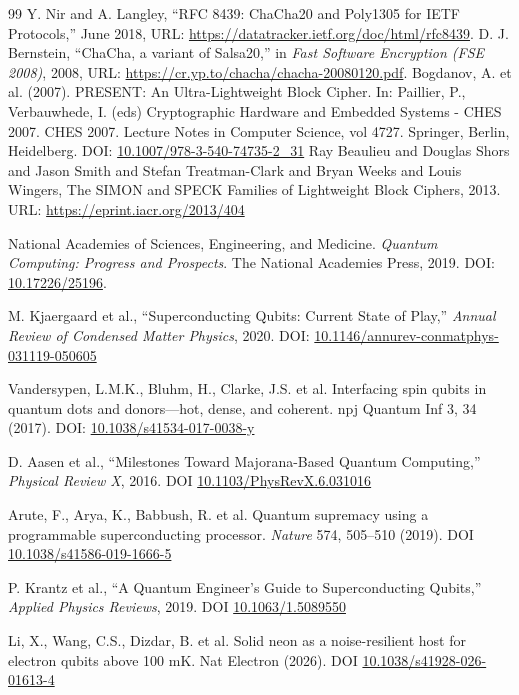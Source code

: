\documentclass[11pt,a4paper]{article}
\begin{document}
\begin{thebibliography}{99}
 Y. Nir and A. Langley, ``RFC 8439: ChaCha20 and Poly1305 for IETF Protocols,'' June 2018, URL: \url{https://datatracker.ietf.org/doc/html/rfc8439}.
 D. J. Bernstein, ``ChaCha, a variant of Salsa20,'' in \emph{Fast Software Encryption (FSE 2008)}, 2008, URL: \url{https://cr.yp.to/chacha/chacha-20080120.pdf}.
 Bogdanov, A. et al. (2007). PRESENT: An Ultra-Lightweight Block Cipher. In: Paillier, P., Verbauwhede, I. (eds) Cryptographic Hardware and Embedded Systems - CHES 2007. CHES 2007. Lecture Notes in Computer Science, vol 4727. Springer, Berlin, Heidelberg. DOI: \href{https://doi.org/10.1007/978-3-540-74735-2\_31}{10.1007/978-3-540-74735-2\_31}
 Ray Beaulieu and Douglas Shors and Jason Smith and Stefan Treatman-Clark and Bryan Weeks and Louis Wingers, The {SIMON} and {SPECK} Families of Lightweight Block Ciphers, 2013. URL: \url{https://eprint.iacr.org/2013/404}

National Academies of Sciences, Engineering, and Medicine.
\textit{Quantum Computing: Progress and Prospects}.  
The National Academies Press, 2019.  
DOI: \href{https://courses.csail.mit.edu/6.857/2019/files/NAE-report-on-quantum-computing.pdf}{10.17226/25196}.

M. Kjaergaard et al., 
``Superconducting Qubits: Current State of Play,'' 
\textit{Annual Review of Condensed Matter Physics}, 2020. DOI: \href{https://doi.org/10.1146/annurev-conmatphys-031119-050605}{10.1146/annurev-conmatphys-031119-050605}

Vandersypen, L.M.K., Bluhm, H., Clarke, J.S. et al. Interfacing spin qubits in quantum dots and donors—hot, dense, and coherent. npj Quantum Inf 3, 34 (2017). DOI: \href{https://doi.org/10.1038/s41534-017-0038-y}{10.1038/s41534-017-0038-y}

D. Aasen et al., 
``Milestones Toward Majorana-Based Quantum Computing,'' 
\textit{Physical Review X}, 2016. DOI \href{https://journals.aps.org/prx/abstract/10.1103/PhysRevX.6.031016}{10.1103/PhysRevX.6.031016}

Arute, F., Arya, K., Babbush, R. et al. Quantum supremacy using a programmable superconducting processor. \textit{Nature} 574, 505–510 (2019). DOI \href{https://doi.org/10.1038/s41586-019-1666-5}{10.1038/s41586-019-1666-5}

P. Krantz et al., 
``A Quantum Engineer's Guide to Superconducting Qubits,'' 
\textit{Applied Physics Reviews}, 2019. DOI \href{https://doi.org/10.1063/1.5089550}{10.1063/1.5089550}

Li, X., Wang, C.S., Dizdar, B. et al. Solid neon as a noise-resilient host for electron qubits above 100 mK. Nat Electron (2026). DOI \href{https://doi.org/10.1038/s41928-026-01613-4}{10.1038/s41928-026-01613-4}

\end{thebibliography}
\end{document}

